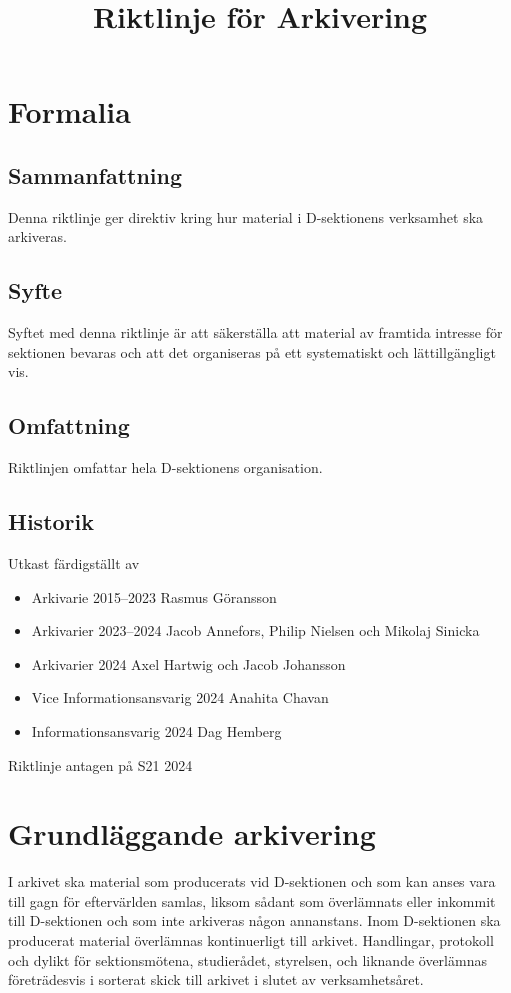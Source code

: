 \documentclass{dsekprotokoll}
\title{Riktlinje för Arkivering}
\author{}
\begin{document}
\maketitle

\section{Formalia}
\subsection{Sammanfattning}
Denna riktlinje ger direktiv kring hur material i D-sektionens
verksamhet ska arkiveras.

\subsection{Syfte}
Syftet med denna riktlinje är att säkerställa att material av
framtida intresse för sektionen bevaras och att det organiseras på
ett systematiskt och lättillgängligt vis.

\subsection{Omfattning}
Riktlinjen omfattar hela D-sektionens organisation.

\subsection{Historik}
Utkast färdigställt av
\begin{itemize}
  \item Arkivarie 2015--2023 Rasmus Göransson
  \item Arkivarier 2023--2024 Jacob Annefors, Philip Nielsen och Mikolaj Sinicka
  \item Arkivarier 2024 Axel Hartwig och Jacob Johansson
  \item Vice Informationsansvarig 2024 Anahita Chavan
  \item Informationsansvarig 2024 Dag Hemberg
\end{itemize}

Riktlinje antagen på S21 2024

\section{Grundläggande arkivering}
I arkivet ska material som producerats vid D-sektionen och som kan
anses vara till gagn för eftervärlden samlas, liksom sådant som
överlämnats eller inkommit till D-sektionen och som inte arkiveras
någon annanstans. Inom D-sektionen ska producerat material överlämnas
kontinuerligt till arkivet. Handlingar, protokoll och dylikt för
sektionsmötena, studierådet, styrelsen, och liknande överlämnas
företrädesvis i sorterat skick till arkivet i slutet av verksamhetsåret.
\end{document}
